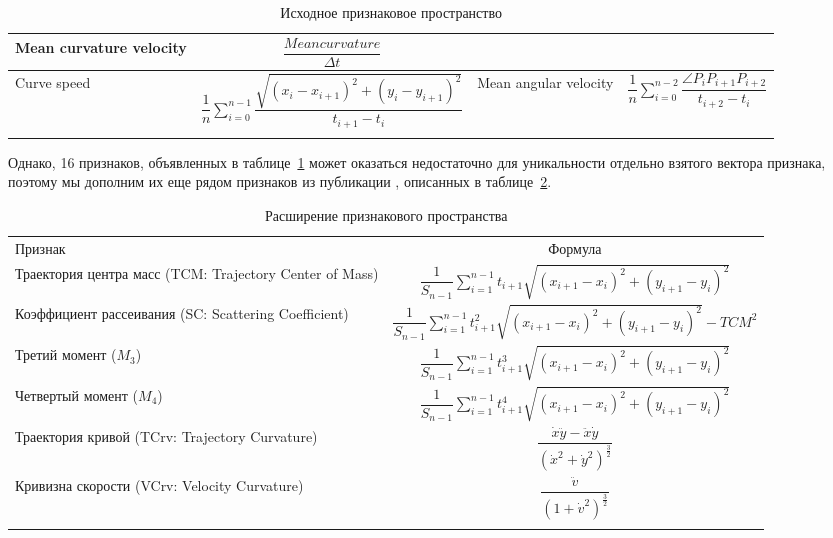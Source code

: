 \documentclass[12pt]{article}
\begin{document}
\begin{table}[h]
\begin{tabular}[c]{ || m{20mm} | c || m{20mm} | c ||}
            Mean curvature velocity & {\centering $\dfrac{Meancurvature}{\Delta t}$} \\
            \hline
            Curve speed & {\centering $\dfrac{1}{n} \sum_{i=0}^{n-1} \dfrac{\sqrt{(x_i-x_{i+1})^2 + (y_i-y_{i+1})^2}}{t_{i+1} - t_i}$} &
            Mean angular velocity & {\centering $\dfrac{1}{n} \sum_{i=0}^{n-2} \dfrac{\angle P_i P_{i+1} P_{i+2}}{t_{i+2} - t_i}$} \\
            \hhline{|b:==:b:==:b|} 
        \end{tabular}
        \caption{Исходное признаковое пространство}
        \label{sec:Overview:Features:table:FeaturesFormulas}
    \end{table}
    
    \par Однако, 16 признаков, объявленных в таблице~\ref{sec:Overview:Features:table:FeaturesFormulas} может оказаться недостаточно для уникальности отдельно взятого вектора признака, поэтому мы дополним их еще рядом признаков из публикации \cite{ArsFeature}, описанных в таблице~\ref{sec:Overview:Features:table:ArsFeaturesFormulas}.
    
    \begin{table}[h]
        \centering
        \renewcommand{\arraystretch}{1.5}
        \renewcommand{\tabcolsep}{2mm}
        \begin{tabular}{ || m{60mm} | c ||}
            \hhline{|t:==:t|} 
            Признак & Формула \\ [2mm]
            \hhline{|:==:|}
            Траектория центра масс (TCM: Trajectory Center of Mass) & $ \dfrac{1}{S_{n-1}} \sum_{i=1}^{n-1} t_{i+1} \sqrt{(x_{i+1} - x_{i})^2 + (y_{i+1} - y_i)^2} $ \\
            \hline
            Коэффициент рассеивания (SC: Scattering Coefficient) &  $ \dfrac{1}{S_{n-1}} \sum_{i=1}^{n-1} t_{i+1}^2 \sqrt{(x_{i+1} - x_{i})^2 + (y_{i+1} - y_i)^2} - TCM^2 $ \\
            \hline
            Третий момент ($M_3$) & $ \dfrac{1}{S_{n-1}} \sum_{i=1}^{n-1} t_{i+1}^3 \sqrt{(x_{i+1} - x_{i})^2 + (y_{i+1} - y_i)^2} $ \\
            \hline
            Четвертый момент ($M_4$) & $ \dfrac{1}{S_{n-1}} \sum_{i=1}^{n-1} t_{i+1}^4 \sqrt{(x_{i+1} - x_{i})^2 + (y_{i+1} - y_i)^2} $ \\
            \hline
            Траектория кривой (TCrv: Trajectory Curvature) & $ \dfrac{\dot{x}\ddot{y} - \ddot{x}\dot{y}}{(\dot{x}^2 + \dot{y}^2)^\tfrac{3}{2}} $ \\
            \hline
            Кривизна скорости (VCrv: Velocity Curvature) & $ \dfrac{\ddot{v}}{(1 + \dot{v}^2)^\tfrac{3}{2}} $ \\
            \hhline{|b:==:b|}
        \end{tabular}
        \caption{Расширение признакового пространства}
        \label{sec:Overview:Features:table:ArsFeaturesFormulas}
    \end{table}
\end{document}
